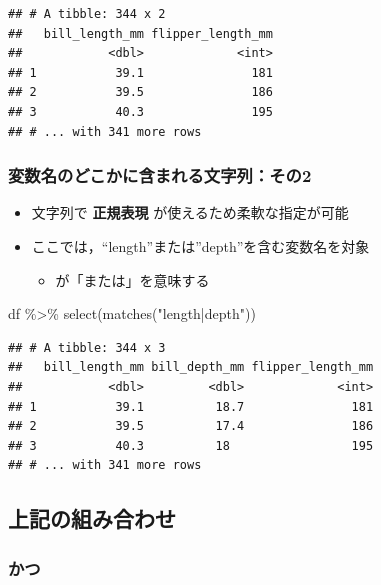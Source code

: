 \documentclass[
  xelatex,ja=standard, b5paper]{bxjsbook}
\newenvironment{Shaded}{\begin{snugshade}}{\end{snugshade}}
\newcommand{\FunctionTok}[1]{\textcolor[rgb]{0.00,0.00,0.00}{#1}}
\newcommand{\NormalTok}[1]{#1}
\newcommand{\SpecialCharTok}[1]{\textcolor[rgb]{0.00,0.00,0.00}{#1}}
\newcommand{\StringTok}[1]{\textcolor[rgb]{0.31,0.60,0.02}{#1}}
\providecommand{\tightlist}{%
  \setlength{\itemsep}{0pt}\setlength{\parskip}{0pt}}
\begin{document}
\begin{verbatim}
## # A tibble: 344 x 2
##   bill_length_mm flipper_length_mm
##            <dbl>             <int>
## 1           39.1               181
## 2           39.5               186
## 3           40.3               195
## # ... with 341 more rows
\end{verbatim}

\hypertarget{select-helper4}{%
\subsubsection{変数名のどこかに含まれる文字列：その2}\label{select-helper4}}

\begin{itemize}
\tightlist
\item
  文字列で \textbf{正規表現} が使えるため柔軟な指定が可能
\item
  ここでは，``length''または''depth''を含む変数名を対象

  \begin{itemize}
  \tightlist
  \item
    \texttt{\textbar{}}が「または」を意味する
  \end{itemize}
\end{itemize}

\begin{Shaded}
\begin{Highlighting}[]
\NormalTok{df }\SpecialCharTok{\%\textgreater{}\%}
  \FunctionTok{select}\NormalTok{(}\FunctionTok{matches}\NormalTok{(}\StringTok{"length|depth"}\NormalTok{))}
\end{Highlighting}
\end{Shaded}

\begin{verbatim}
## # A tibble: 344 x 3
##   bill_length_mm bill_depth_mm flipper_length_mm
##            <dbl>         <dbl>             <int>
## 1           39.1          18.7               181
## 2           39.5          17.4               186
## 3           40.3          18                 195
## # ... with 341 more rows
\end{verbatim}

\hypertarget{select-helper5}{%
\subsection{上記の組み合わせ}\label{select-helper5}}

\hypertarget{select-helper5-1}{%
\subsubsection{かつ}\label{select-helper5-1}}
\end{document}
